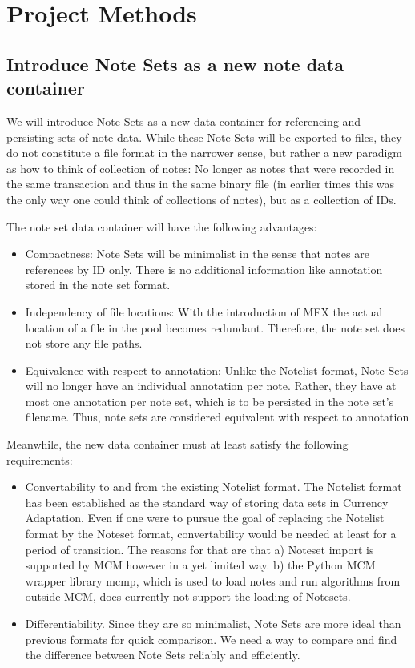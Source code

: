\chapter{Project Methods}
\label{chap:projectsteps}


\section{Introduce Note Sets as a new note data container}
\label{noteset_goal}
We will introduce Note Sets as a new data container for referencing and persisting sets of note data. While these Note Sets will be exported to files, they do not constitute a file format in the narrower sense, but rather a new paradigm as how to think of collection of notes: No longer as notes that were recorded in the same transaction and thus in the same binary file (in earlier times this was the only way one could think of collections of notes), but as a collection of IDs.

The note set data container will have the following advantages:
\begin{itemize}
\item Compactness: Note Sets will be minimalist in the sense that notes are references by ID only. There is no additional information like annotation stored in the note set format.
\item Independency of file locations: With the introduction of MFX the actual location of a file in the pool becomes redundant. Therefore, the note set does not store any file paths.
\item Equivalence with respect to annotation: Unlike the Notelist format, Note Sets will no longer have an individual annotation per note. Rather, they have at most one annotation per note set, which is to be persisted in the note set's filename. Thus, note sets are considered equivalent with respect to annotation
\end{itemize}
Meanwhile, the new data container must at least satisfy the following requirements:
\begin{itemize}
\item Convertability to and from the existing Notelist format. The Notelist format has been established as the standard way of storing data sets in Currency Adaptation. Even if one were to pursue the goal of replacing the Notelist format by the Noteset format, convertability would be needed at least for a period of transition. The reasons for that are that a) Noteset import is supported by MCM however in a yet limited way. b) the Python MCM wrapper library mcmp, which is used to load notes and run algorithms from outside MCM, does currently not support the loading of Notesets.
 \item Differentiability. Since they are so minimalist, Note Sets are more ideal than previous formats for quick comparison. We need a way to compare and find the difference between Note Sets reliably and efficiently.
\end{itemize}

